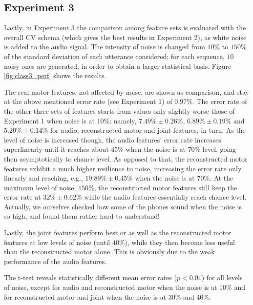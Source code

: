 \subsection{Experiment 3}
\label{subsec:exp3}

Lastly, in Experiment 3 the comparison among feature sets is evaluated with the
overall CV schema (which gives the best results in Experiment 2), as white noise is added
to the audio signal. The intensity of noise is changed from $10\%$ to $150\%$ of
the standard deviation of each utterance considered; for each sequence, $10$ noisy
ones are generated, in order to obtain a larger statistical basis.
Figure \ref{fig:class3_perf} shows the results.

The real motor features, not affected by noise, are shown as comparison, and stay at
the above mentioned error rate (see Experiment 1) of $0.97\%$. The error rate of the
other three sets of features starts from values only slightly worse those of
Experiment 1 when noise is at $10\%$: namely,
$7.49\% \pm 0.26\%$, 
$6.89\% \pm 0.19\%$ and 
$5.20\% \pm 0.14\%$ for audio, reconstructed motor and joint features, in turn.
As the level of noise is increased though, the audio features' error rate
increases superlinearly until it reaches about $45\%$ when the noise is at $70\%$
level, going then asymptotically to chance level. As opposed to that, the reconstructed
motor features exhibit a much higher resilience to noise, increasing the error rate
only linearly and reaching, e.g., $19.89\% \pm 0.45\%$ when the noise is at $70\%$.
At the maximum level of noise, $150\%$, the reconstructed motor features still keep
the error rate at $32\% \pm 0.62\%$ while the audio features essentially reach chance
level. Actually, we ourselves checked how some of the phones sound when the noise is
so high, and found them rather hard to understand!

Lastly, the joint features perform best or as well as the reconstructed motor features
at low levels of noise (until $40\%$), while they then become less useful than the
reconstructed motor alone. This is obviously due to the weak performance of the audio
features.

The t-test reveals statistically different mean error rates ($p<0.01$) for all levels of
noise, except for audio and reconstructed motor when the noise
is at $10\%$ and for reconstructed motor and joint when the noise is at $30\%$
and $40\%$.
